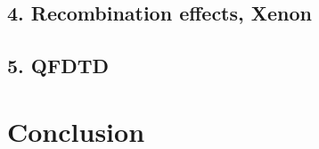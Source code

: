 \documentclass{beamer}
\begin{document}
\subsection{4. Recombination effects, Xenon}
\begin{frame}{}
\end{frame}

\subsection{5. QFDTD}
\begin{frame}{}
\end{frame}


\section{Conclusion}

\begin{frame}{}
\end{frame}
\end{document}
